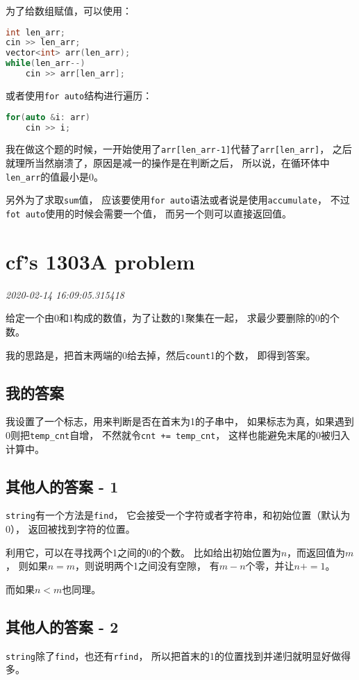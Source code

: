 \documentclass{peterlitsdoc}
\newcommand{\timetx}[1]
    {\par\noindent\emph{\pltgray\small #1}\vspace{2em}}
\newcommand{\vb}{\verb}
\begin{document}
为了给数组赋值，可以使用：
\begin{lstlisting}[language=C++]
int len_arr;
cin >> len_arr;
vector<int> arr(len_arr);
while(len_arr--)
    cin >> arr[len_arr];
\end{lstlisting}
或者使用\vb|for auto|结构进行遍历：
\begin{lstlisting}[language=C++]
for(auto &i: arr)
    cin >> i;
\end{lstlisting}

我在做这个题的时候，一开始使用了\vb|arr[len_arr-1]|代替了\vb|arr[len_arr]|，
之后就理所当然崩溃了，原因是减一的操作是在判断之后，
所以说，在循环体中\vb|len_arr|的值最小是0。

另外为了求取\vb|sum|值，
应该要使用\vb|for auto|语法或者说是使用\vb|accumulate|，
不过\vb|fot auto|使用的时候会需要一个值，
而另一个则可以直接返回值。


\section{cf's 1303A problem}\timetx{2020-02-14 16:09:05.315418}

给定一个由0和1构成的数值，为了让数的1聚集在一起，
求最少要删除的0的个数。

我的思路是，把首末两端的0给去掉，然后\vb|count|1的个数，
即得到答案。

\subsection{我的答案}
我设置了一个标志，用来判断是否在首末为1的子串中，
如果标志为真，如果遇到0则把\vb|temp_cnt|自增，
不然就令\vb|cnt += temp_cnt|，
这样也能避免末尾的0被归入计算中。

\subsection{其他人的答案 - 1}
\vb|string|有一个方法是\vb|find|，
它会接受一个字符或者字符串，和初始位置（默认为0），
返回被找到字符的位置。

利用它，可以在寻找两个1之间的0的个数。
比如给出初始位置为$n$，而返回值为$m$，
则如果$n = m$，则说明两个1之间没有空隙，
有$m - n$个零，并让$n += 1$。

而如果$n < m$也同理。

\subsection{其他人的答案 - 2}
\vb|string|除了\vb|find|，也还有\vb|rfind|，
所以把首末的1的位置找到并递归就明显好做得多。
\end{document}
